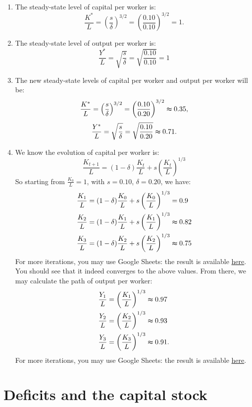 \documentclass[]{book}
\theoremstyle{definition}
\theoremstyle{definition}
\theoremstyle{definition}
\theoremstyle{remark}
\begin{document}
\begin{enumerate}
\def\labelenumi{\arabic{enumi}.}
\item
  The steady-state level of capital per worker is:
  \[\frac{K^{*}}{L}=\left(\frac{s}{\delta}\right)^{3/2}=\left(\frac{0.10}{0.10}\right)^{3/2}=1.\]
\item
  The steady-state level of output per worker is:
  \[\frac{Y^{*}}{L}=\sqrt{\frac{s}{\delta}}=\sqrt{\frac{0.10}{0.10}}=1\]
\item
  The new steady-state levels of capital per worker and output per
  worker will be:
  \[\frac{K^{*}}{L}=\left(\frac{s}{\delta}\right)^{3/2}=\left(\frac{0.10}{0.20}\right)^{3/2}\thickapprox0.35,\]
  \[\frac{Y^{*}}{L}=\sqrt{\frac{s}{\delta}}=\sqrt{\frac{0.10}{0.20}}\thickapprox0.71.\]
\item
  We know the evolution of capital per worker is:
  \[\frac{K_{t+1}}{L}=(1-\delta)\frac{K_{t}}{L}+s\left(\frac{K_{t}}{L}\right)^{1/3}\]
  So starting from \(\frac{K_{0}}{L}=1\), with \(s=0.10\),
  \(\delta=0.20\), we have: \[\begin{aligned}
  \frac{K_{1}}{L}&=(1-\delta)\frac{K_{0}}{L}+s\left(\frac{K_{0}}{L}\right)^{1/3}=0.9\\
  \frac{K_{2}}{L}&=(1-\delta)\frac{K_{1}}{L}+s\left(\frac{K_{1}}{L}\right)^{1/3}\thickapprox0.82\\
  \frac{K_{3}}{L}&=(1-\delta)\frac{K_{2}}{L}+s\left(\frac{K_{2}}{L}\right)^{1/3}\thickapprox0.75
  \end{aligned}\] For more iterations, you may use Google Sheets: the
  result is available
  \href{https://docs.google.com/spreadsheets/d/1T81-Dx1iUtzE2zUHV9y1rgwYqTKpno47ZCqC1Kmf2aY/edit?usp=sharing}{here}.
  You should see that it indeed converges to the above values. From
  there, we may calculate the path of output per worker:
  \[\begin{aligned}
  \frac{Y_{1}}{L}&=\left(\frac{K_{1}}{L}\right)^{1/3}\thickapprox0.97\\
  \frac{Y_{2}}{L}&=\left(\frac{K_{2}}{L}\right)^{1/3}\thickapprox0.93\\
  \frac{Y_{3}}{L}&=\left(\frac{K_{3}}{L}\right)^{1/3}\thickapprox0.91.
  \end{aligned}\] For more iterations, you may use Google Sheets: the
  result is available
  \href{https://docs.google.com/spreadsheets/d/1T81-Dx1iUtzE2zUHV9y1rgwYqTKpno47ZCqC1Kmf2aY/edit?usp=sharing}{here}.
\end{enumerate}

\section{Deficits and the capital
stock}\label{deficits-and-the-capital-stock-1}
\end{document}
